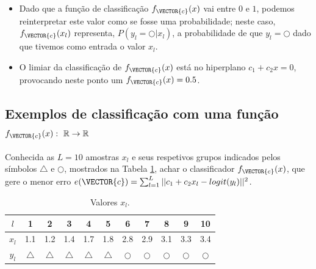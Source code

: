 \begin{tcbattention}
\begin{itemize}
\item Dado que a função de classificação $f_{\VECTOR{c}}(x)$ vai entre $0$ e $1$,
podemos reinterpretar este valor como se fosse uma probabilidade;
neste caso, $f_{\VECTOR{c}}(x_l)$ representa, $P(y_l=\bigcirc|x_l)$, 
a probabilidade de que $y_l=\bigcirc$ dado que tivemos como entrada o valor $x_l$.
\item O limiar da classificação de $f_{\VECTOR{c}}(x)$ está no hiperplano $c_1  +c_2x=0$,
provocando neste ponto um $f_{\VECTOR{c}}(x)=0.5$.
\end{itemize}
\end{tcbattention}



\subsection{Exemplos de classificação com uma função
$f_{\VECTOR{c}}(x):~\mathbb{R} \rightarrow \mathbb{R}$ }

\begin{example}\label{ex:theo:reglogr1r1}
Conhecida as $L=10$ amostras $x_l$ e seus respetivos grupos indicados pelos símbolos $\bigtriangleup$ e $\bigcirc$, 
mostrados na Tabela \ref{table:theo:reglogr1r1:xn},
achar o classificador $f_{\VECTOR{c}}(x)$, 
que gere o menor erro $e(\VECTOR{c}) =  \sum_{l=1}^{L} ||c_1 +c_2 x_l -logit(y_l)||^2$.
\end{example}


\begin{table}[h!]
\centering
\begin{tabular}{|c||c|c|c|c|c||c|c|c|c|c|} 
 \hline
$l$   & 1 & 2 & 3 & 4 & 5 & 6 & 7 & 8 & 9 & 10 \\ \hline \hline
$x_l$ & 1.1 & 1.2 & 1.4 & 1.7 & 1.8 & 2.8 & 2.9 & 3.1 & 3.3 & 3.4  \\ \hline
$y_l$ & $\bigtriangleup$ & $\bigtriangleup$ & $\bigtriangleup$ & $\bigtriangleup$ & $\bigtriangleup$
      & $\bigcirc$ & $\bigcirc$ & $\bigcirc$ & $\bigcirc$ & $\bigcirc$ \\ \hline
\end{tabular}
\caption{Valores $x_l$.}
\label{table:theo:reglogr1r1:xn}
\end{table}


